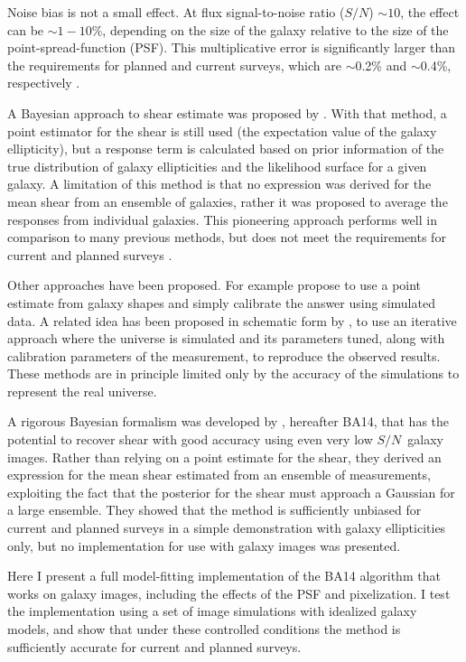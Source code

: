 \documentclass[12pt,preprint]{aastex}
\newcommand{\sn}{$S/N$}
\begin{document}
Noise bias is not a small effect.  At flux signal-to-noise ratio (\sn) $\sim
10$, the effect can be $\sim1-10$\%, depending on the size of the galaxy
relative to the size of the point-spread-function (PSF).  This multiplicative
error is significantly larger than the requirements for planned and current
surveys, which are $\sim$0.2\% and $\sim$0.4\%, respectively
\citep{HutererSystematics06}.

A Bayesian approach to shear estimate was proposed by \cite{Miller07}.  With
that method, a point estimator for the shear is still used (the expectation
value of the galaxy ellipticity), but a response term is calculated based on
prior information of the true distribution of galaxy ellipticities and the
likelihood surface for a given galaxy.  A limitation of this method is that no
expression was derived for the mean shear from an ensemble of galaxies, rather
it was proposed to average the responses from individual galaxies.  This
pioneering approach performs well in comparison to many previous methods, but
does not meet the requirements for current and planned surveys \citep{ba14}.

Other approaches have been proposed. For example \cite{Zuntz13} propose to use
a point estimate from galaxy shapes and simply calibrate the answer using
simulated data.  A related idea has been proposed in schematic form by
\cite{Refregier13}, to use an iterative approach where the universe is
simulated and its parameters tuned, along with calibration parameters of the
measurement, to reproduce the observed results.  These methods are in principle
limited only by the accuracy of the simulations to represent the real universe.

A rigorous Bayesian formalism was developed by \cite{ba14}, hereafter BA14,
that has the potential to recover shear with good accuracy using even very low
\sn\ galaxy images.  Rather than relying on a point estimate for the shear,
they derived an expression for the mean shear estimated from an ensemble of
measurements, exploiting the fact that the posterior for the shear must
approach a Gaussian for a large ensemble.  They showed that the method is
sufficiently unbiased for current and planned surveys in a simple demonstration
with galaxy ellipticities only, but no implementation for use with galaxy
images was presented.

Here I present a full model-fitting implementation of the BA14 algorithm that
works on galaxy images, including the effects of the PSF and pixelization.  I
test the implementation using a set of image simulations with idealized galaxy
models, and show that under these controlled conditions the method is
sufficiently accurate for current and planned surveys.
\end{document}
